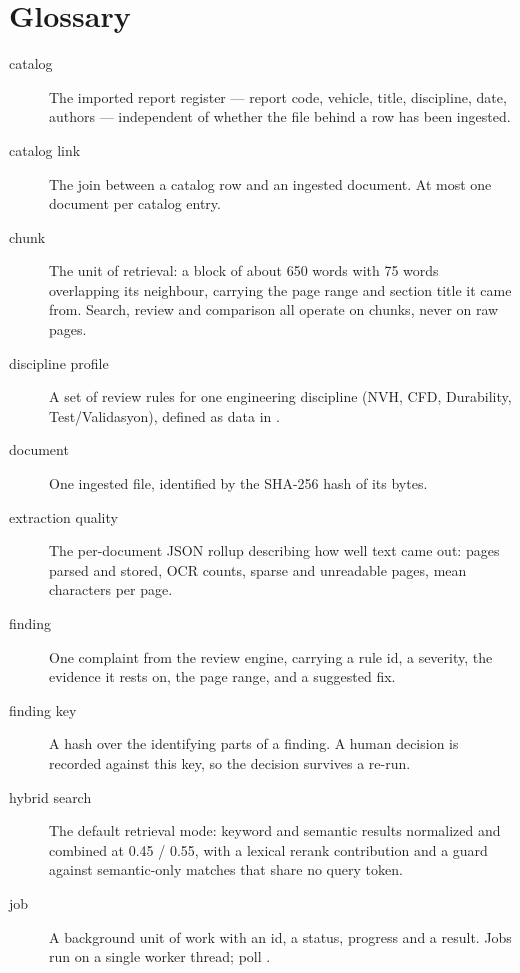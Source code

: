 \chapter{Glossary}
\label{ch:glossary}

\begin{description}

\item[catalog] The imported report register --- report code, vehicle, title,
discipline, date, authors --- independent of whether the file behind a row has
been ingested.

\item[catalog link] The join between a catalog row and an ingested document. At
most one document per catalog entry.

\item[chunk] The unit of retrieval: a block of about 650 words with 75 words
overlapping its neighbour, carrying the page range and section title it came
from. Search, review and comparison all operate on chunks, never on raw pages.

\item[discipline profile] A set of review rules for one engineering discipline
(NVH, CFD, Durability, Test/Validasyon), defined as data in
.

\item[document] One ingested file, identified by the SHA-256 hash of its bytes.

\item[extraction quality] The per-document JSON rollup describing how well text
came out: pages parsed and stored, OCR counts, sparse and unreadable pages, mean
characters per page.

\item[finding] One complaint from the review engine, carrying a rule id, a
severity, the evidence it rests on, the page range, and a suggested fix.

\item[finding key] A hash over the identifying parts of a finding. A human
decision is recorded against this key, so the decision survives a re-run.

\item[hybrid search] The default retrieval mode: keyword and semantic results
normalized and combined at 0.45 / 0.55, with a lexical rerank contribution and a
guard against semantic-only matches that share no query token.

\item[job] A background unit of work with an id, a status, progress and a
result. Jobs run on a single worker thread; poll
.


\end{description}
